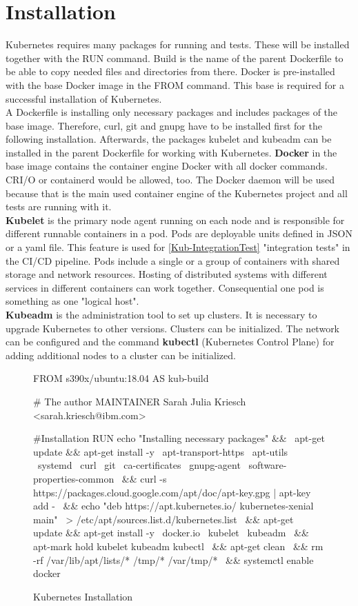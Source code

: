 \section{Installation}

Kubernetes requires many packages for running and tests. These will be installed together with the RUN command.
Build is the name of the parent Dockerfile to be able to copy needed files and directories from there.
Docker is pre-installed with the base Docker image in the FROM command. This base is required for a successful installation of Kubernetes. \\
A Dockerfile is installing only necessary packages and includes packages of the base image. Therefore, curl, git and gnupg have to be installed first for the following installation.
Afterwards, the packages kubelet and kubeadm can be installed in the parent Dockerfile for working with Kubernetes. \textbf{Docker} in the base image contains the container engine Docker with all docker commands. CRI/O or containerd would be allowed, too. 
The Docker daemon will be used because that is the main used container engine of the Kubernetes project and all tests are running with it. \\ 
\textbf{Kubelet} is the primary node agent running on each node and is responsible for different runnable containers in a pod. Pods are deployable units defined in JSON or a yaml file. This feature is used for \ref{Kub-IntegrationTest} "integration tests" in the \gls{CI/CD} pipeline.
Pods include a single or a group of containers with shared storage and network resources. Hosting of distributed systems  with different services in different containers can work together. Consequential one pod is something as one "logical host". \\
\textbf{Kubeadm} is the administration tool to set up clusters. It is necessary to upgrade Kubernetes to other versions. Clusters can be initialized. The network can be configured and the command \textbf{kubectl} (Kubernetes Control Plane) for adding additional nodes to a cluster can be initialized. 

\begin{figure}[H]
\centering
\begin{boxedverbatim}
FROM s390x/ubuntu:18.04 AS kub-build
 
# The author
MAINTAINER Sarah Julia Kriesch <sarah.kriesch@ibm.com>

#Installation
RUN echo "Installing necessary packages" && \
apt-get update && apt-get install -y \
apt-transport-https \
apt-utils \
systemd \
curl \
git \
ca-certificates \
gnupg-agent \
software-properties-common \
&& curl -s https://packages.cloud.google.com/apt/doc/apt-key.gpg | apt-key add - \
&& echo "deb https://apt.kubernetes.io/ kubernetes-xenial main" \
> /etc/apt/sources.list.d/kubernetes.list \
&& apt-get update && apt-get install -y \
docker.io \
kubelet \
kubeadm \
&& apt-mark hold kubelet kubeadm kubectl \
&& apt-get clean \
&& rm -rf /var/lib/apt/lists/* /tmp/* /var/tmp/* \
&& systemctl enable docker 
\end{boxedverbatim}
 \caption{Kubernetes Installation}
    \label{kubernetes-installation}
\end{figure}

